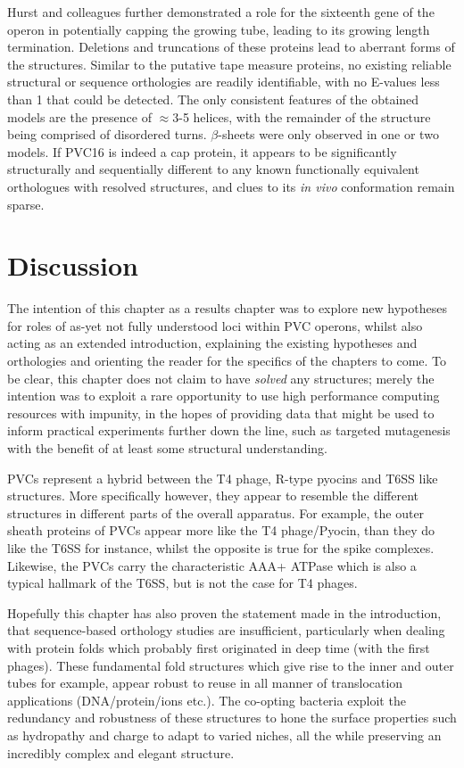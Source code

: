 Hurst and colleagues further demonstrated a role for the sixteenth gene of the operon in potentially capping the growing tube, leading to its growing length termination. Deletions and truncations of these proteins lead to aberrant forms of the structures. Similar to the putative tape measure proteins, no existing reliable structural or sequence orthologies are readily identifiable, with no E-values less than 1 that could be detected. The only consistent features of the obtained models are the presence of $\approx$3-5 helices, with the remainder of the structure being comprised of disordered turns. $\beta$-sheets were only observed in one or two models. If PVC16 is indeed a cap protein, it appears to be significantly structurally and sequentially different to any known functionally equivalent orthologues with resolved structures, and clues to its \emph{in vivo} conformation remain sparse.



\clearpage
\section{Discussion}
The intention of this chapter as a results chapter was to explore new hypotheses for roles of as-yet not fully understood loci within PVC operons, whilst also acting as an extended introduction, explaining the existing hypotheses and orthologies and orienting the reader for the specifics of the chapters to come. To be clear, this chapter does not claim to have \emph{solved} any structures; merely the intention was to exploit a rare opportunity to use high performance computing resources with impunity, in the hopes of providing data that might be used to inform practical experiments further down the line, such as targeted mutagenesis with the benefit of at least some structural understanding.

PVCs represent a hybrid between the T4 phage, R-type pyocins and T6SS like structures. More specifically however, they appear to resemble the different structures in different parts of the overall apparatus. For example, the outer sheath proteins of PVCs appear more like the T4 phage/Pyocin, than they do like the T6SS for instance, whilst the opposite is true for the spike complexes. Likewise, the PVCs carry the characteristic AAA+ ATPase which is also a typical hallmark of the T6SS, but is not the case for T4 phages.

Hopefully this chapter has also proven the statement made in the introduction, that sequence-based orthology studies are insufficient, particularly when dealing with protein folds which probably first originated in deep time (with the first phages). These fundamental fold structures which give rise to the inner and outer tubes for example, appear robust to reuse in all manner of translocation applications (DNA/protein/ions etc.). The co-opting bacteria exploit the redundancy and robustness of these structures to hone the surface properties such as hydropathy and charge to adapt to varied niches, all the while preserving an incredibly complex and elegant structure.

